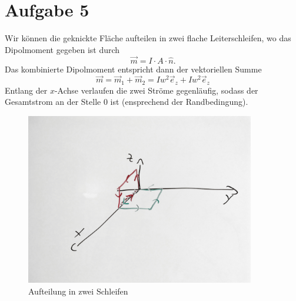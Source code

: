 \documentclass[11pt a4paper]{article}
\begin{document}
\section*{Aufgabe 5}
Wir können die geknickte Fläche aufteilen in zwei flache Leiterschleifen, 
wo das Dipolmoment gegeben ist durch
\[ \vec m = I \cdot A \cdot \hat n. \]
Das kombinierte Dipolmoment entspricht dann der vektoriellen Summe
\[
	\vec m = \vec m_1 + \vec m_2 
	= Iw^2 \vec e_z + Iw^2 \vec e_z
\]
Entlang der $x$-Achse verlaufen die zwei Ströme gegenläufig, sodass der 
Gesamtstrom an der Stelle 0 ist (ensprechend der Randbedingung).
\begin{figure}[H]
	\centering
	\includegraphics[width=10cm]{5_1}
	\caption{Aufteilung in zwei Schleifen}
\end{figure}
\end{document}
